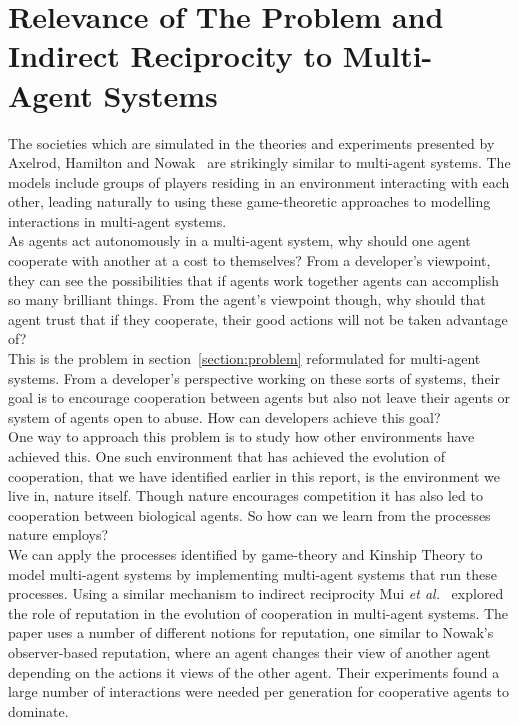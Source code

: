\documentclass[]{final_report}
\begin{document}
\section{Relevance of The Problem and Indirect Reciprocity to Multi-Agent Systems}
The societies which are simulated in the theories and experiments presented by Axelrod, Hamilton and Nowak~\cite{evolution_of_cooperation, five_rules_coop} are strikingly similar to multi-agent systems. The models include groups of players residing in an environment interacting with each other, leading naturally to using these game-theoretic approaches to modelling interactions in multi-agent systems.\\
As agents act autonomously in a multi-agent system, why should one agent cooperate with another at a cost to themselves? From a developer's viewpoint, they can see the possibilities that if agents work together agents can accomplish so many brilliant things. From the agent's viewpoint though, why should that agent trust that if they cooperate, their good actions will not be taken advantage of?\\
This is the problem in section~\ref{section:problem} reformulated for multi-agent systems. From a developer's perspective working on these sorts of systems, their goal is to encourage cooperation between agents but also not leave their agents or system of agents open to abuse. How can developers achieve this goal?\\
One way to approach this problem is to study how other environments have achieved this. One such environment that has achieved the evolution of cooperation, that we have identified earlier in this report, is the environment we live in, nature itself. Though nature encourages competition it has also led to cooperation between biological agents. So how can we learn from the processes nature employs?\\
We can apply the processes identified by game-theory and Kinship Theory to model multi-agent systems by implementing multi-agent systems that run these processes. Using a similar mechanism to indirect reciprocity Mui \textit{et al.}~\cite{Mui:2002:NRM:544741.544807} explored the role of reputation in the evolution of cooperation in multi-agent systems. The paper uses a number of different notions for reputation, one similar to Nowak's observer-based reputation, where an agent changes their view of another agent depending on the actions it views of the other agent. Their experiments found a large number of interactions were needed per generation for cooperative agents to dominate.\\
\end{document}
